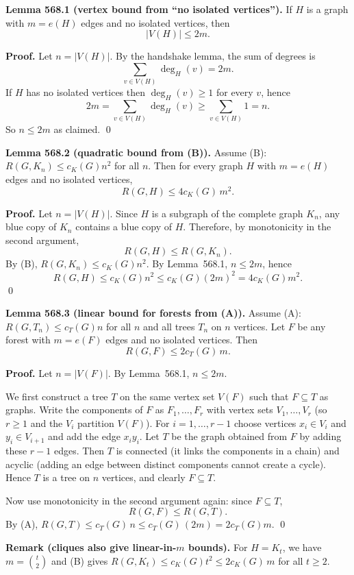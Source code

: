 \textbf{Lemma 568.1 (vertex bound from ``no isolated vertices'').}
If $H$ is a graph with $m=e(H)$ edges and no isolated vertices, then
\[
|V(H)| \le 2m.
\]

\textbf{Proof.}
Let $n=|V(H)|$. By the handshake lemma, the sum of degrees is
\[
\sum_{v\in V(H)} \deg_H(v)=2m.
\]
If $H$ has no isolated vertices then $\deg_H(v)\ge 1$ for every $v$, hence
\[
2m=\sum_{v\in V(H)} \deg_H(v) \ge \sum_{v\in V(H)} 1 = n.
\]
So $n\le 2m$ as claimed. \qed

\medskip

\textbf{Lemma 568.2 (quadratic bound from (B)).}
Assume (B): $R(G,K_n)\le c_K(G)n^2$ for all $n$. Then for every graph $H$ with $m=e(H)$ edges and no isolated vertices,
\[
R(G,H) \le 4c_K(G)\,m^2.
\]

\textbf{Proof.}
Let $n=|V(H)|$. Since $H$ is a subgraph of the complete graph $K_n$, any blue copy of $K_n$ contains a blue copy of $H$. Therefore, by monotonicity in the second argument,
\[
R(G,H) \le R(G,K_n).
\]
By (B), $R(G,K_n)\le c_K(G)n^2$. By Lemma~568.1, $n\le 2m$, hence
\[
R(G,H) \le c_K(G)n^2 \le c_K(G)(2m)^2 = 4c_K(G)m^2.
\]
\qed

\medskip

\textbf{Lemma 568.3 (linear bound for forests from (A)).}
Assume (A): $R(G,T_n)\le c_T(G)n$ for all $n$ and all trees $T_n$ on $n$ vertices. Let $F$ be any forest with $m=e(F)$ edges and no isolated vertices. Then
\[
R(G,F) \le 2c_T(G)\,m.
\]

\textbf{Proof.}
Let $n=|V(F)|$. By Lemma~568.1, $n\le 2m$.

We first construct a tree $T$ on the same vertex set $V(F)$ such that $F\subseteq T$ as graphs. Write the components of $F$ as $F_1,\dots,F_r$ with vertex sets $V_1,\dots,V_r$ (so $r\ge 1$ and the $V_i$ partition $V(F)$). For $i=1,\dots,r-1$ choose vertices $x_i\in V_i$ and $y_i\in V_{i+1}$ and add the edge $x_iy_i$. Let $T$ be the graph obtained from $F$ by adding these $r-1$ edges. Then $T$ is connected (it links the components in a chain) and acyclic (adding an edge between distinct components cannot create a cycle). Hence $T$ is a tree on $n$ vertices, and clearly $F\subseteq T$.

Now use monotonicity in the second argument again: since $F\subseteq T$,
\[
R(G,F) \le R(G,T).
\]
By (A), $R(G,T)\le c_T(G)\,n \le c_T(G)\,(2m)=2c_T(G)m$.
\qed

\medskip

\textbf{Remark (cliques also give linear-in-$m$ bounds).}
For $H=K_t$, we have $m=\binom t2$ and (B) gives $R(G,K_t)\le c_K(G)t^2\le 2c_K(G)\,m$ for all $t\ge 2$.

